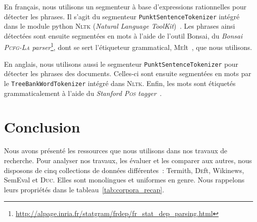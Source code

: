     En français, nous utilisons un segmenteur à base d'expressions rationnelles
    pour détecter les phrases. Il s'agit du segmenteur
    \texttt{PunktSentenceTokenizer} intégré dans le module python \textsc{Nltk}
    (\textit{Natural Language ToolKit})~\cite{bird2009nltk}. Les phrases ainsi
    détectées sont ensuite segmentées en mots à l'aide de l'outil Bonsai, du
    \textit{Bonsai \textsc{Pcfg-La}
    parser}\footnote{\url{http://alpage.inria.fr/statgram/frdep/fr_stat_dep_parsing.html}},
    dont se sert l'étiqueteur grammatical, \textsc{Me}lt~\cite{denis2009melt},
    que nous utilisons.

    En anglais, nous utilisons aussi le segmenteur
    \texttt{PunktSentenceTokenizer} pour détecter les phrases des documents.
    Celles-ci sont ensuite segmentées en mots par le
    \texttt{Tree\-BankWordTokenizer} intégré dans \textsc{Nltk}. Enfin, les mots
    sont étiquetés grammaticalement à l'aide du \textit{Stanford \textsc{Pos}
    tagger}~\cite{toutanova2003stanfordpostagger}.


  \section{Conclusion}
  \label{sec:main-data_description-conclusion}
    Nous avons présenté les ressources que nous utilisons dans nos
    travaux de recherche. Pour analyser nos travaux, les évaluer et les comparer
    aux autres, nous disposons de cinq collections de données différentes~:
    Termith, \textsc{De}ft, Wikinews, SemEval et \textsc{Duc}. Elles sont
    monolingues et uniformes en genre. Nous rappelons leurs propriétés dans
    le tableau~\ref{tab:corpora_recap}.

